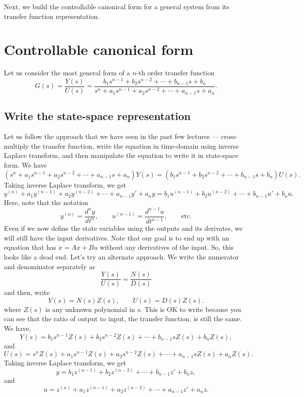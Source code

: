 \documentclass{ee122_notes}
\begin{document}
Next, we build the controllable canonical form for a general system from its transfer function representation.
\section{Controllable canonical form}
Let us consider the most general form of a $n$-th order transfer function
\[
G(s) = \frac{Y(s)}{U(s)} = \frac{b_{1} s^{n-1} + b_2 s^{n-2} + \cdots + b_{n-1} s + b_n}{s^n + a_1 s^{n-1} + a_2 s^{n-2} + \cdots + a_{n-1} s + a_n}.
\]
\subsection{Write the state-space representation}
Let us follow the approach that we have seen in the past few lectures --- cross-multiply the transfer function, write the equation in time-domain using inverse Laplace transform, and then manipulate the equation to write it in state-space form. We have
\[
(s^n + a_1 s^{n-1} + a_2 s^{n-2} + \cdots + a_{n-1} s + a_n) Y(s) = (b_{1} s^{n-1} + b_2 s^{n-2} + \cdots + b_{n-1} s + b_n) U(s).
\]
Taking inverse Laplace transform, we get
\[
y^{(n)} + a_1 y^{(n-1)} + a_2 y^{(n-2)} + \cdots + a_{n-1} y' + a_n y = b_{1} u^{(n-1)} + b_2 u^{(n-2)} + \cdots + b_{n-1} u' + b_n u.
\]
Here, note that the notation 
\[
y^{(n)} = \frac{d^n y}{dt^n}, \qquad u^{(n-1)} = \frac{d^{n-1} u}{dt^{n-1}}, \qquad \text{etc.}
\]
Even if we now define the state variables using the outputs and its derivates, we will still have the input derivatives. Note that our goal is to end up with an equation that has $\dot x = Ax + Bu$ without any derivatives of the input. So, this looks like a dead end. Let's try an alternate approach. We write the numerator and denominator separately as
\[
\frac{Y(s)}{U(s)} = \frac{N(s)}{D(s)}
\]
and then, write
\[
Y(s) = N(s) Z(s), \qquad U(s) = D(s) Z(s).
\]
where $Z(s)$ is any unknown polynomial in $s$. This is OK to write because you can see that the ratio of output to input, the transfer function, is still the same. We have,
\[
Y(s) = b_{1} s^{n-1} Z(s) + b_2 s^{n-2} Z(s) + \cdots + b_{n-1} s Z(s) + b_n Z(s),
\]
and 
\[
U(s) = s^n Z(s) + a_1 s^{n-1} Z(s) + a_2 s^{n-2} Z(s) + \cdots + a_{n-1} s Z(s) + a_n Z(s).
\]
Taking inverse Laplace transform, we get
\[
y = b_{1} z^{(n-1)} + b_2 z^{(n-2)} + \cdots + b_{n-1} z' + b_n z,
\]
and
\[
u = z^{(n)} + a_1 z^{(n-1)} + a_2 z^{(n-2)} + \cdots + a_{n-1} z' + a_n z.
\]
\end{document}
